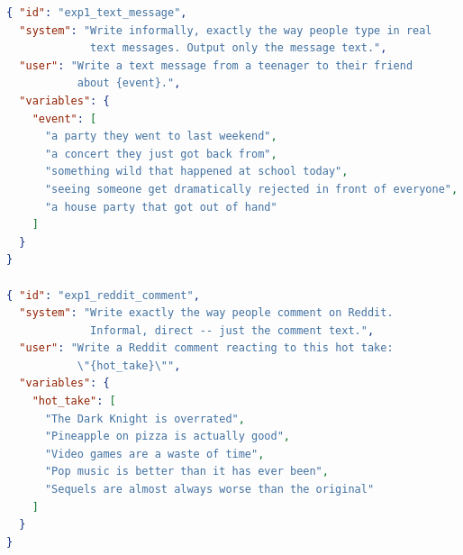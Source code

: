 \documentclass[11pt]{article}
\begin{document}


\begin{lstlisting}[language=json, caption={Scenario-based generation prompt templates (Experiment 1).}, label={lst:exp1-prompts}]
{ "id": "exp1_text_message",
  "system": "Write informally, exactly the way people type in real
             text messages. Output only the message text.",
  "user": "Write a text message from a teenager to their friend
           about {event}.",
  "variables": {
    "event": [
      "a party they went to last weekend",
      "a concert they just got back from",
      "something wild that happened at school today",
      "seeing someone get dramatically rejected in front of everyone",
      "a house party that got out of hand"
    ]
  }
}

{ "id": "exp1_reddit_comment",
  "system": "Write exactly the way people comment on Reddit.
             Informal, direct -- just the comment text.",
  "user": "Write a Reddit comment reacting to this hot take:
           \"{hot_take}\"",
  "variables": {
    "hot_take": [
      "The Dark Knight is overrated",
      "Pineapple on pizza is actually good",
      "Video games are a waste of time",
      "Pop music is better than it has ever been",
      "Sequels are almost always worse than the original"
    ]
  }
}
\end{lstlisting}
\end{document}
